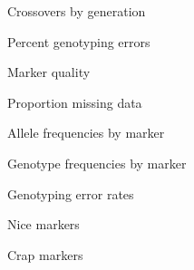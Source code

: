 \documentclass[aspectratio=169,12pt,t]{beamer}
\begin{document}
\begin{frame}[c]{Crossovers by generation}

\note{
}
\end{frame}


\begin{frame}[c]{Percent genotyping errors}

\note{
}
\end{frame}




\begin{frame}[c]{}

\centerline{\Large \color{title} Marker quality}

\note{
}

\end{frame}



\begin{frame}[c]{Proportion missing data}

\note{
}
\end{frame}


\begin{frame}[c]{Allele frequencies by marker}

\note{
}
\end{frame}

\begin{frame}[c]{Genotype frequencies by marker}

\note{
}
\end{frame}

\begin{frame}[c]{Genotyping error rates}

\note{
}
\end{frame}

\begin{frame}[c]{Nice markers}

\note{
}
\end{frame}

\begin{frame}[c]{Crap markers}

\note{
}
\end{frame}
\end{document}
